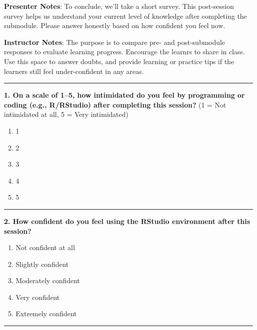 \documentclass[
  letterpaper,
  DIV=11,
  numbers=noendperiod]{scrartcl}
\providecommand{\tightlist}{%
  \setlength{\itemsep}{0pt}\setlength{\parskip}{0pt}}
\begin{document}
\textbf{Presenter Notes}: To conclude, we'll take a short survey. This
post-session survey helps us understand your current level of knowledge
after completing the submodule. Please answer honestly based on how
confident you feel now.

\textbf{Instructor Notes}: The purpose is to compare pre- and
post-submodule responses to evaluate learning progress. Encourage the
learnrs to share in class. Use this space to answer doubts, and provide
learning or practice tips if the learners still feel under-confident in
any areas.

\begin{center}\rule{0.5\linewidth}{0.5pt}\end{center}

\textbf{1. On a scale of 1--5, how intimidated do you feel by
programming or coding (e.g., R/RStudio) after completing this session?}
(1 = Not intimidated at all, 5 = Very intimidated)

\begin{enumerate}
\def\labelenumi{\alph{enumi}.}
\tightlist
\item
  1
\item
  2
\item
  3
\item
  4
\item
  5
\end{enumerate}

\begin{center}\rule{0.5\linewidth}{0.5pt}\end{center}

\textbf{2. How confident do you feel using the RStudio environment after
this session?}

\begin{enumerate}
\def\labelenumi{\alph{enumi}.}
\tightlist
\item
  Not confident at all\\
\item
  Slightly confident\\
\item
  Moderately confident\\
\item
  Very confident\\
\item
  Extremely confident
\end{enumerate}

\begin{center}\rule{0.5\linewidth}{0.5pt}\end{center}
\end{document}
